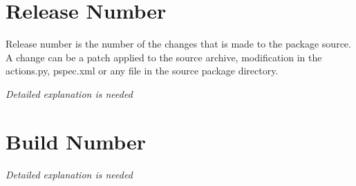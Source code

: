 \documentclass[a4paper,11pt]{article}
\begin{document}
\section{Release Number}

Release number is the number of the changes that is made to the
package source. A change can be a patch applied to the source archive,
modification in the actions.py, pspec.xml or any file in the source
package directory.

\emph{Detailed explanation is needed}

\section{Build Number}

\emph{Detailed explanation is needed}
\end{document}
